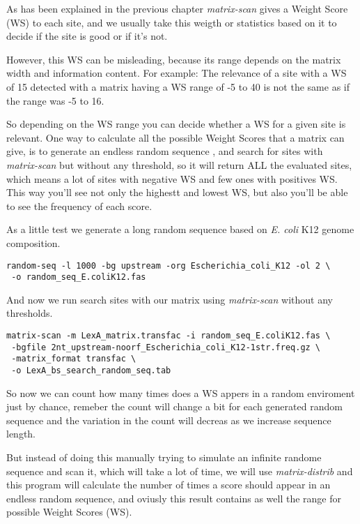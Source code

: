 As has been explained in the previous chapter \textit{matrix-scan}
gives a Weight Score (WS) to each site, and we usually take this
weigth or statistics based on it to decide if the site is good or if
it's not.

However, this WS can be misleading, because its range depends on the
matrix width and information content. For example: The relevance of a
site with a WS of 15 detected with a matrix having a WS range of -5 to
40 is not the same as if the range was -5 to 16.

So depending on the WS range you can decide whether a WS for a given
site is relevant. One way to calculate all the possible Weight Scores
that a matrix can give, is to generate an endless random sequence ,
and search for sites with \textit{matrix-scan} but without any
threshold, so it will return ALL the evaluated sites, which means a
lot of sites with negative WS and few ones with positives
WS. This way you'll see not only the highestt and lowest WS, but also
you'll be able to see the frequency of each score.

As a little test we generate a long random sequence based on
\textit{E. coli} K12 genome composition.

{\color{Blue} \begin{footnotesize} 
\begin{verbatim}
random-seq -l 1000 -bg upstream -org Escherichia_coli_K12 -ol 2 \
 -o random_seq_E.coliK12.fas
\end{verbatim} \end{footnotesize}
}

And now we run search sites with our matrix using \textit{matrix-scan}
without any thresholds.

{\color{Blue} 
\begin{footnotesize}
\begin{verbatim}
matrix-scan -m LexA_matrix.transfac -i random_seq_E.coliK12.fas \
 -bgfile 2nt_upstream-noorf_Escherichia_coli_K12-1str.freq.gz \
 -matrix_format transfac \
 -o LexA_bs_search_random_seq.tab
\end{verbatim} 
\end{footnotesize} 
}
    
So now we can count how many times does a WS appers in a random
enviroment just by chance, remeber the count will change a bit for
each generated random sequence and the variation in the count will
decreas as we increase sequence length.

But instead of doing this manually trying to simulate an infinite
randome sequence and scan it, which will take a lot of time, we will
use \textit{matrix-distrib} and this program will calculate the number
of times a score should appear in an endless random sequence, and
oviusly this result contains as well the range for possible Weight
Scores (WS).

